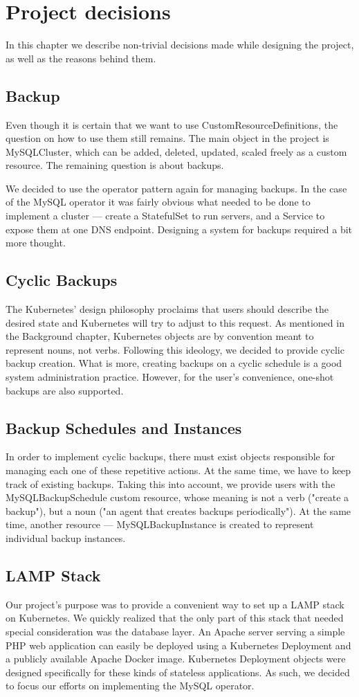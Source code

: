 \chapter{Project decisions}
In this chapter we describe non-trivial decisions made while designing the project, as well as the
reasons behind them.

\section{Backup}
Even though it is certain that we want to use CustomResourceDefinitions, the question on how to
use them still remains. The main object in the project is MySQLCluster, which can be added,
deleted, updated, scaled freely as a custom resource. The remaining question is about backups.

We decided to use the operator pattern again for managing backups. In the case of the MySQL
operator it was fairly obvious what needed to be done to implement a cluster --- create a
StatefulSet to run servers, and a Service to expose them at one DNS endpoint. Designing a system
for backups required a bit more thought.

\section{Cyclic Backups}
The Kubernetes’ design philosophy proclaims that users should describe the desired state and
Kubernetes will try to adjust to this request. As mentioned in the Background chapter, Kubernetes
objects are by convention meant to represent nouns, not verbs. Following this ideology, we
decided to provide cyclic backup creation. What is more, creating backups on a cyclic schedule
is a good system administration practice. However, for the user’s convenience, one-shot backups are
also supported.

\section{Backup Schedules and Instances}
In order to implement cyclic backups, there must exist objects responsible for managing each one of
these repetitive actions. At the same time, we have to keep track of existing backups. Taking this
into account, we provide users with the MySQLBackupSchedule custom resource, whose meaning is not a
verb ("create a backup"), but a noun ("an agent that creates backups periodically"). At the same
time, another resource --- MySQLBackupInstance is created to represent individual backup instances.

\section{LAMP Stack}
Our project’s purpose was to provide a convenient way to set up a LAMP
stack on Kubernetes. We quickly realized that the only part of this stack that needed special
consideration was the database layer. An Apache server serving a simple PHP web application can
easily be deployed using a Kubernetes Deployment and a publicly available Apache Docker image.
Kubernetes Deployment objects were designed specifically for these kinds of stateless applications.
As such, we decided to focus our efforts on implementing the MySQL operator.
